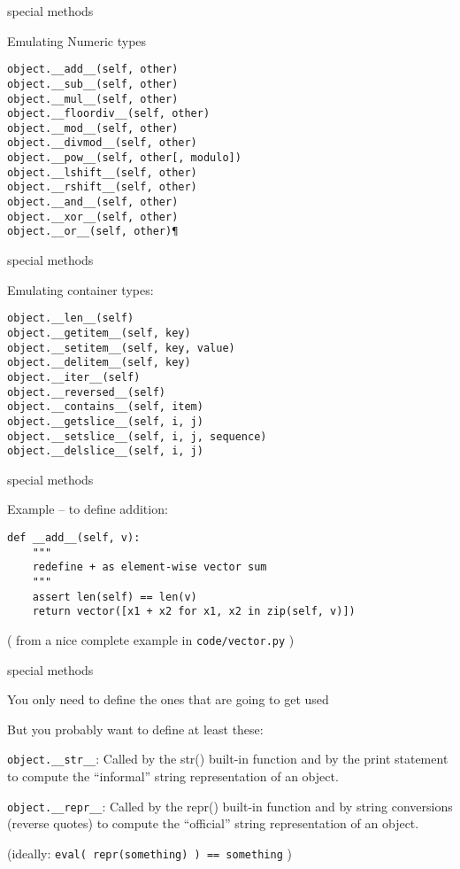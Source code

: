 \documentclass{beamer}
\begin{document}
\begin{frame}[fragile]{special methods}

{\Large Emulating Numeric types}

\begin{verbatim}
object.__add__(self, other)
object.__sub__(self, other)
object.__mul__(self, other)
object.__floordiv__(self, other)
object.__mod__(self, other)
object.__divmod__(self, other)
object.__pow__(self, other[, modulo])
object.__lshift__(self, other)
object.__rshift__(self, other)
object.__and__(self, other)
object.__xor__(self, other)
object.__or__(self, other)¶
\end{verbatim}

\end{frame} 

\begin{frame}[fragile]{special methods}

{\Large Emulating container types:}

\begin{verbatim}
object.__len__(self)
object.__getitem__(self, key)
object.__setitem__(self, key, value)
object.__delitem__(self, key)
object.__iter__(self)
object.__reversed__(self)
object.__contains__(self, item)
object.__getslice__(self, i, j)
object.__setslice__(self, i, j, sequence)
object.__delslice__(self, i, j)
\end{verbatim}

\end{frame} 

\begin{frame}[fragile]{special methods}

{\Large Example -- to define addition:}

\begin{verbatim}
def __add__(self, v):
    """
    redefine + as element-wise vector sum
    """
    assert len(self) == len(v)
    return vector([x1 + x2 for x1, x2 in zip(self, v)])
\end{verbatim}

( from a nice complete example in \verb|code/vector.py| )

\end{frame} 


\begin{frame}[fragile]{special methods}

\vfill
{\Large You only need to define the ones that are going to get used}

\vfill
{\Large But you probably want to define at least these:}

\vfill
\verb|object.__str__|: Called by the str() built-in function and by the print statement to compute the “informal” string representation of an object.

\vfill
\verb|object.__repr__|: Called by the repr() built-in function and by string conversions (reverse quotes) to compute the “official” string representation of an object.

\vfill
(ideally: \verb|eval( repr(something) ) == something| )

\end{frame} 
\end{document}
